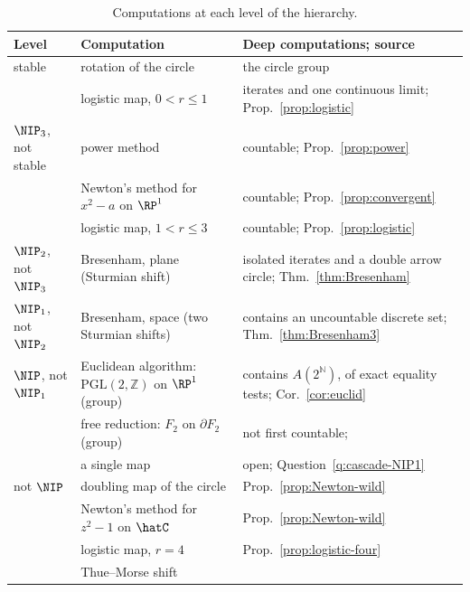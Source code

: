 \begin{table}[ht]
\centering
\small
\renewcommand{\arraystretch}{1.25}
\begin{tabular}{>{\raggedright\arraybackslash}p{2.1cm}>{\raggedright\arraybackslash}p{4.4cm}>{\raggedright\arraybackslash}p{4.6cm}}
\hline
Level & Computation & Deep computations; source\\
\hline
stable & rotation of the circle & the circle group\\
& logistic map, $0<r\le1$ & iterates and one continuous limit; Prop.~\ref{prop:logistic}\\
$\NIP_3$, not stable & power method & countable; Prop.~\ref{prop:power}\\
& Newton's method for $x^2-a$ on $\RP^1$ & countable; Prop.~\ref{prop:convergent}\\
& logistic map, $1<r\le3$ & countable; Prop.~\ref{prop:logistic}\\
$\NIP_2$, not $\NIP_3$ & Bresenham, plane (Sturmian shift) & isolated iterates and a double arrow circle; Thm.~\ref{thm:Bresenham}\\
$\NIP_1$, not $\NIP_2$ & Bresenham, space (two Sturmian shifts) & contains an uncountable discrete set; Thm.~\ref{thm:Bresenham3}\\
$\NIP$, not $\NIP_1$ & Euclidean algorithm: $\mathrm{PGL}(2,\mathbb{Z})$ on $\RP^1$ (group) & contains $A(2^{\mathbb{N}})$, of exact equality tests; Cor.~\ref{cor:euclid}\\
& free reduction: $F_2$ on $\partial F_2$ (group) & not first countable; \cite{glasner2022tame}\\
& a single map & open; Question~\ref{q:cascade-NIP1}\\
not $\NIP$ & doubling map of the circle & Prop.~\ref{prop:Newton-wild}\\
& Newton's method for $z^2-1$ on $\hatC$ & Prop.~\ref{prop:Newton-wild}\\
& logistic map, $r=4$ & Prop.~\ref{prop:logistic-four}\\
& Thue--Morse shift & \cite{GlasnerMegrelishvili2023}\\
\hline
\end{tabular}
\vspace{6pt}
\caption{Computations at each level of the hierarchy.}
\label{tab:hierarchy}
\end{table}
